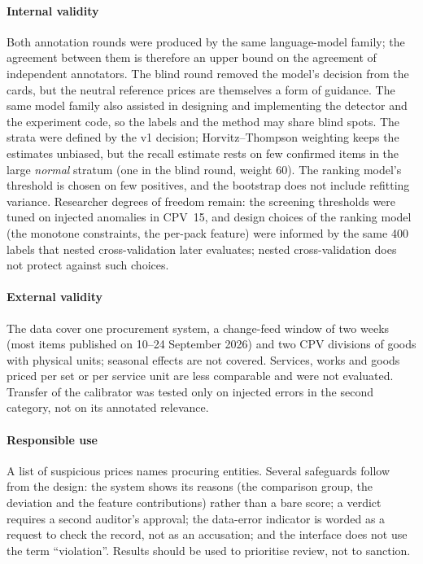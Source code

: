 \documentclass[conference]{IEEEtran}
\begin{document}
\paragraph{Internal validity} Both annotation rounds were produced by the same language-model family; the
agreement between them is therefore an upper bound on the agreement of independent annotators. The blind
round removed the model's decision from the cards, but the neutral reference prices are themselves a form
of guidance. The same model family also assisted in designing and implementing the detector and the
experiment code, so the labels and the method may share blind spots. The strata were defined by the v1
decision; Horvitz--Thompson weighting keeps the estimates unbiased, but the recall estimate rests on few
confirmed items in the large \emph{normal} stratum (one in the blind round, weight 60). The ranking model's
threshold is chosen on few positives, and the bootstrap does not include refitting variance. Researcher
degrees of freedom remain: the screening thresholds were tuned on injected anomalies in CPV~15, and design
choices of the ranking model (the monotone constraints, the per-pack feature) were informed by the same 400
labels that nested cross-validation later evaluates; nested cross-validation does not protect against
such choices.

\paragraph{External validity} The data cover one procurement system, a change-feed window of two weeks
(most items published on 10--24 September 2026) and two CPV divisions of goods with physical units; seasonal
effects are not covered. Services, works and goods priced per set or per service unit are
less comparable and were not evaluated. Transfer of the calibrator was tested only on injected errors in
the second category, not on its annotated relevance.

\paragraph{Responsible use} A list of suspicious prices names procuring entities. Several safeguards
follow from the design: the system shows its reasons (the comparison group, the deviation and the feature
contributions) rather than a bare score; a verdict requires a second auditor's approval; the data-error
indicator is worded as a request to check the record, not as an accusation; and the interface does not
use the term ``violation''. Results should be used to prioritise review, not to sanction.
\end{document}
